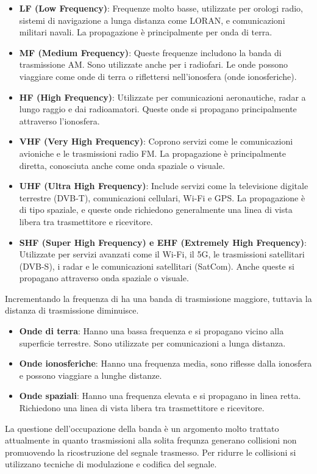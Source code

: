 \begin{itemize}
    \item \textbf{LF (Low Frequency)}: Frequenze molto basse, utilizzate per orologi radio, sistemi di navigazione a lunga distanza come LORAN, e comunicazioni militari navali. La propagazione è principalmente per onda di terra.
    \item \textbf{MF (Medium Frequency)}: Queste frequenze includono la banda di trasmissione AM. Sono utilizzate anche per i radiofari. Le onde possono viaggiare come onde di terra o riflettersi nell'ionosfera (onde ionosferiche).
    \item \textbf{HF (High Frequency)}: Utilizzate per comunicazioni aeronautiche, radar a lungo raggio e dai radioamatori. Queste onde si propagano principalmente attraverso l'ionosfera.
    \item \textbf{VHF (Very High Frequency)}: Coprono servizi come le comunicazioni avioniche e le trasmissioni radio FM. La propagazione è principalmente diretta, conosciuta anche come onda spaziale o visuale.
    \item \textbf{UHF (Ultra High Frequency)}: Include servizi come la televisione digitale terrestre (DVB-T), comunicazioni cellulari, Wi-Fi e GPS. La propagazione è di tipo spaziale, e queste onde richiedono generalmente una linea di vista libera tra trasmettitore e ricevitore.
    \item \textbf{SHF (Super High Frequency) e EHF (Extremely High Frequency)}: Utilizzate per servizi avanzati come il Wi-Fi, il 5G, le trasmissioni satellitari (DVB-S), i radar e le comunicazioni satellitari (SatCom). Anche queste si propagano attraverso onda spaziale o visuale.
\end{itemize}

Incrementando la frequenza di ha una banda di trasmissione maggiore, tuttavia la distanza di trasmissione diminuisce.

\begin{itemize}
    \item \textbf{Onde di terra}: Hanno una bassa frequenza e si propagano vicino alla superficie terrestre. Sono utilizzate per comunicazioni a lunga distanza.
    \item \textbf{Onde ionosferiche}: Hanno una frequenza media, sono riflesse dalla ionosfera e possono viaggiare a lunghe distanze.
    \item \textbf{Onde spaziali}: Hanno una frequenza elevata e si propagano in linea retta. Richiedono una linea di vista libera tra trasmettitore e ricevitore.
\end{itemize}

La questione dell'occupazione della banda è un argomento molto trattato attualmente in quanto trasmissioni alla solita frequnza generano collisioni non promuovendo la ricostruzione del segnale trasmesso. Per ridurre le collisioni si utilizzano tecniche di modulazione e codifica del segnale.


